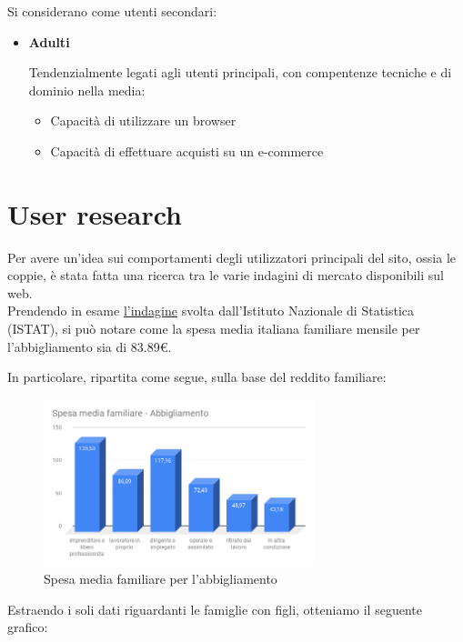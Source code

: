 \documentclass[12pt,italian,]{report}
\providecommand{\tightlist}{%
  \setlength{\itemsep}{0pt}\setlength{\parskip}{0pt}}
\begin{document}
Si considerano come utenti secondari:

\begin{itemize}
\item
  \textbf{Adulti}

  Tendenzialmente legati agli utenti principali, con compentenze
  tecniche e di dominio nella media:

  \begin{itemize}
  \tightlist
  \item
    Capacità di utilizzare un browser
  \item
    Capacità di effettuare acquisti su un e-commerce
  \end{itemize}
\end{itemize}

\hypertarget{user-research}{%
\section{User research}\label{user-research}}

Per avere un'idea sui comportamenti degli utilizzatori principali del
sito, ossia le coppie, è stata fatta una ricerca tra le varie indagini
di mercato disponibili sul web.
\\
Prendendo in esame \href{http://siqual.istat.it/SIQual/visualizza.do?id=0021002\&refresh=true\&language=IT}{l'indagine}
svolta dall'Istituto Nazionale di Statistica (ISTAT), si può notare come la spesa media italiana familiare mensile per l'abbigliamento sia di 83.89€.

In particolare, ripartita come segue, sulla base del reddito familiare:

\begin{figure}[h]
\centering
\includegraphics[width=0.7\textwidth,height=\textheight]{img/Spesa_media_familiare_abbigliamento.png}
\caption{Spesa media familiare per l'abbigliamento}
\end{figure}

Estraendo i soli dati riguardanti le famiglie con figli, otteniamo il
seguente grafico:
\end{document}
